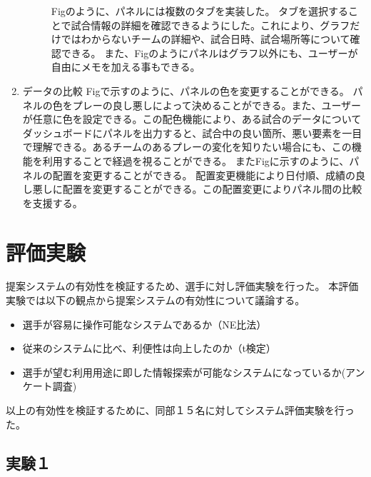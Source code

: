 \documentclass[sotsuron]{kuee}
\begin{document}
\begin{enumerate}
\begin{description}
					Figのように、パネルには複数のタブを実装した。
					タブを選択することで試合情報の詳細を確認できるようにした。これにより、グラフだけではわからないチームの詳細や、試合日時、試合場所等について確認できる。
					また、Figのようにパネルはグラフ以外にも、ユーザーが自由にメモを加える事もできる。
				\end{description}
			\item データの比較
				Figで示すのように、パネルの色を変更することができる。
				パネルの色をプレーの良し悪しによって決めることができる。また、ユーザーが任意に色を設定できる。この配色機能により、ある試合のデータについてダッシュボードにパネルを出力すると、試合中の良い箇所、悪い要素を一目で理解できる。あるチームのあるプレーの変化を知りたい場合にも、この機能を利用することで経過を視ることができる。
				またFigに示すのように、パネルの配置を変更することができる。
				配置変更機能により日付順、成績の良し悪しに配置を変更することができる。この配置変更によりパネル間の比較を支援する。
		\end{enumerate}

\chapter{評価実験}
	提案システムの有効性を検証するため、選手に対し評価実験を行った。
	本評価実験では以下の観点から提案システムの有効性について議論する。
	\begin{itemize}
		\item 選手が容易に操作可能なシステムであるか（NE比法）
		\item 従来のシステムに比べ、利便性は向上したのか（t検定）
		\item 選手が望む利用用途に即した情報探索が可能なシステムになっているか(アンケート調査)
	\end{itemize}
	以上の有効性を検証するために、同部１５名に対してシステム評価実験を行った。
	\section{実験１}
\end{document}
